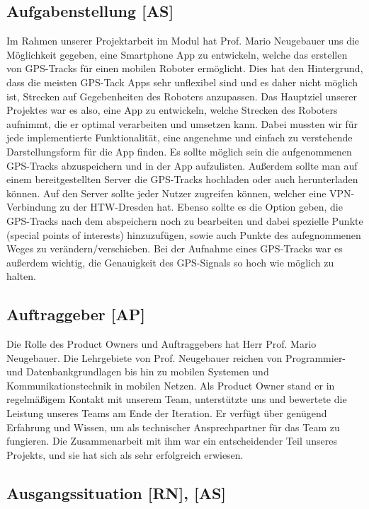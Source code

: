 \documentclass[10pt]{article}
\begin{document}
\subsection{Aufgabenstellung [AS]}
    Im Rahmen unserer Projektarbeit im Modul  hat Prof. Mario Neugebauer uns die Möglichkeit gegeben,
    eine Smartphone App zu entwickeln, welche das erstellen von GPS-Tracks für einen mobilen 
    Roboter ermöglicht. Dies hat den Hintergrund, dass die meisten GPS-Tack Apps sehr unflexibel sind und es daher nicht 
    möglich ist, Strecken auf Gegebenheiten des Roboters anzupassen. Das Hauptziel unserer Projektes war es also, eine App zu entwickeln, 
    welche Strecken des Roboters aufnimmt, die er optimal verarbeiten und umsetzen kann.
    Dabei mussten wir für jede implementierte Funktionalität,
    eine angenehme und einfach zu verstehende Darstellungsform für die App finden.
    Es sollte möglich sein die aufgenommenen GPS-Tracks abzuspeichern und in der App aufzulisten.
    Außerdem sollte man auf einem bereitgestellten Server die GPS-Tracks hochladen oder auch herunterladen können.
    Auf den Server sollte jeder Nutzer zugreifen können, welcher eine VPN-Verbindung zu der HTW-Dresden hat.
    Ebenso sollte es die Option geben, die GPS-Tracks nach dem abspeichern noch zu bearbeiten und dabei spezielle Punkte (special points of interests) 
    hinzuzufügen, sowie auch Punkte des aufegnommenen Weges zu verändern/verschieben.
    Bei der Aufnahme eines GPS-Tracks war es außerdem wichtig, die Genauigkeit des GPS-Signals so hoch wie möglich zu halten. 
\subsection{Auftraggeber [AP]}
    Die Rolle des Product Owners und Auftraggebers hat Herr Prof. Mario Neugebauer. Die Lehrgebiete von Prof. Neugebauer
    reichen von Programmier- und Datenbankgrundlagen bis hin zu mobilen Systemen und Kommunikationstechnik in 
    mobilen Netzen. Als Product Owner stand er in regelmäßigem Kontakt mit unserem Team, unterstützte uns und
    bewertete die Leistung unseres Teams am Ende der Iteration. Er verfügt über genügend Erfahrung und Wissen,
    um als technischer Ansprechpartner für das Team zu fungieren. Die Zusammenarbeit mit ihm war ein entscheidender Teil 
    unseres Projekts, und sie hat sich als sehr erfolgreich erwiesen.

\subsection{Ausgangssituation [RN], [AS]}
\end{document}
